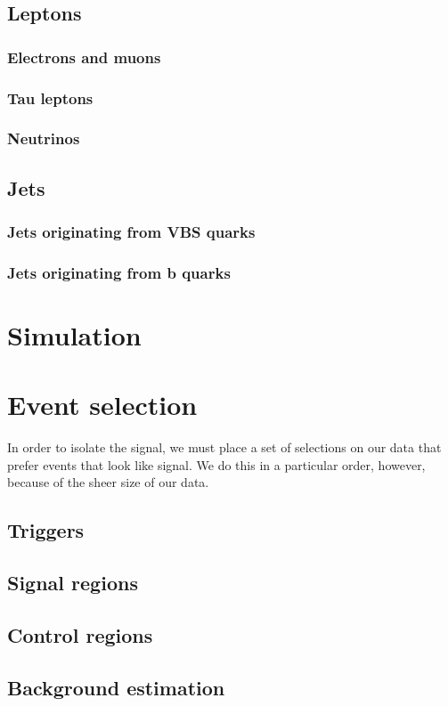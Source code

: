 \subsection{Leptons}
\subsubsection{Electrons and muons}
\subsubsection{Tau leptons}
\subsubsection{Neutrinos}
\subsection{Jets}
\subsubsection{Jets originating from VBS quarks}\label{sec:vbsjets}
\subsubsection{Jets originating from b quarks}

\section{Simulation}

\section{Event selection}
In order to isolate the signal, we must place a set of selections on our data that prefer events that look like signal. 
We do this in a particular order, however, because of the sheer size of our data. 
\subsection{Triggers}
\subsection{Signal regions}
\subsection{Control regions}
\subsection{Background estimation}

